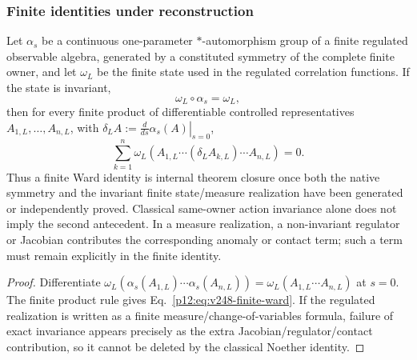 \documentclass[12pt,a4paper]{article}
\begin{document}
\subsubsection{Finite identities under reconstruction}
\label{p12:sec:finite-identity-reconstruction}

\begin{proposition}
\label{p12:prop:v248-finite-quantum-ward-antecedent}
Let \(\alpha_s\) be a continuous one-parameter \(*\)-automorphism group of a
finite regulated observable algebra, generated by a constituted symmetry of
the complete finite owner, and let \(\omega_L\) be the finite state used in
the regulated correlation functions.  If the state is invariant,
\[
\omega_L\!\circ\alpha_s=\omega_L,
\]
then for every finite product of differentiable controlled representatives
\(A_{1,L},\ldots,A_{n,L}\), with
\(\delta_L A:=\left.\frac{d}{ds}\alpha_s(A)\right|_{s=0}\),
\begin{equation}
\label{p12:eq:v248-finite-ward}
\boxed{
\sum_{k=1}^n
\omega_L\!\left(
 A_{1,L}\cdots (\delta_LA_{k,L})\cdots A_{n,L}
\right)=0 .}
\end{equation}
Thus a finite Ward identity is internal theorem closure once both the native
symmetry and the invariant finite state/measure realization have been
generated or independently proved.  Classical same-owner action invariance
alone does not imply the second antecedent.  In a measure realization, a
non-invariant regulator or Jacobian contributes the corresponding anomaly or
contact term; such a term must remain explicitly in the finite identity.
\end{proposition}

\begin{proof}
Differentiate
\(
\omega_L(\alpha_s(A_{1,L})\cdots\alpha_s(A_{n,L}))
=\omega_L(A_{1,L}\cdots A_{n,L})
\)
at \(s=0\).  The finite product rule gives
Eq.~\eqref{p12:eq:v248-finite-ward}.  If the regulated realization is written
as a finite measure/change-of-variables formula, failure of exact invariance
appears precisely as the extra Jacobian/regulator/contact contribution, so it
cannot be deleted by the classical Noether identity.
\end{proof}
\end{document}
